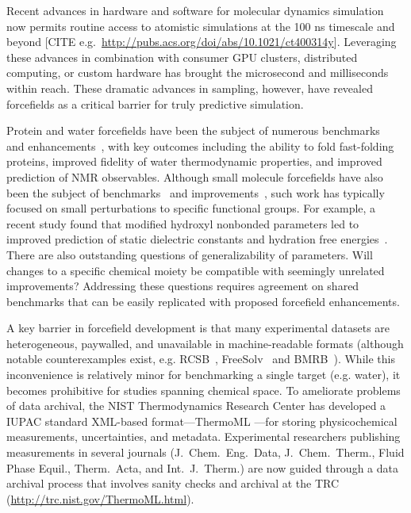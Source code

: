 \documentclass[aps,pre,twocolumn,nofootinbib,superscriptaddress,linenumbers]{revtex4-1}
\begin{document}
Recent advances in hardware and software for molecular dynamics simulation now permits routine access to atomistic simulations at the 100 ns timescale and beyond {\color{red}[CITE e.g.~\url{http://pubs.acs.org/doi/abs/10.1021/ct400314y}]}. 
Leveraging these advances in combination with consumer GPU clusters, distributed computing, or custom hardware has brought the microsecond and milliseconds within reach.  
These dramatic advances in sampling, however, have revealed forcefields as a critical barrier for truly predictive simulation.  

Protein and water forcefields have been the subject of numerous benchmarks~\cite{lindorff2012systematic} and enhancements~\cite{li2011iterative, best2012optimization, Lindorff-Larsen2010}, with key outcomes including the ability to fold fast-folding proteins, improved fidelity of water thermodynamic properties, and improved prediction of NMR observables.  
Although small molecule forcefields have also been the subject of benchmarks~\cite{caleman2011force} and improvements~\cite{fennell2014fixed}, such work has typically focused on small perturbations to specific functional groups.  
For example, a recent study found that modified hydroxyl nonbonded parameters led to improved prediction of static dielectric constants and hydration free energies~\cite{fennell2014fixed}.
There are also outstanding questions of generalizability of parameters.
Will changes to a specific chemical moiety be compatible with seemingly unrelated improvements?  
Addressing these questions requires agreement on shared benchmarks that can be easily replicated with proposed forcefield enhancements.

A key barrier in forcefield development is that many experimental datasets are heterogeneous, paywalled, and unavailable in machine-readable formats (although notable counterexamples exist, e.g. RCSB~\cite{Berman2000}, FreeSolv~\cite{freesolv} and BMRB~\cite{Ulrich2008}).  
While this inconvenience is relatively minor for benchmarking a single target (e.g. water), it becomes prohibitive for studies spanning chemical space.  
To ameliorate problems of data archival, the NIST Thermodynamics Research Center has developed a IUPAC standard XML-based format---ThermoML \cite{frenkel2006xml}---for storing physicochemical measurements, uncertainties, and metadata.
 Experimental researchers publishing measurements in several journals (J.~Chem.~Eng.~Data, J.~Chem.~Therm., Fluid Phase Equil., Therm.~Acta, and Int.~J.~Therm.) are now guided through a data archival process that involves sanity checks and archival at the TRC (\url{http://trc.nist.gov/ThermoML.html}).  
\end{document}
